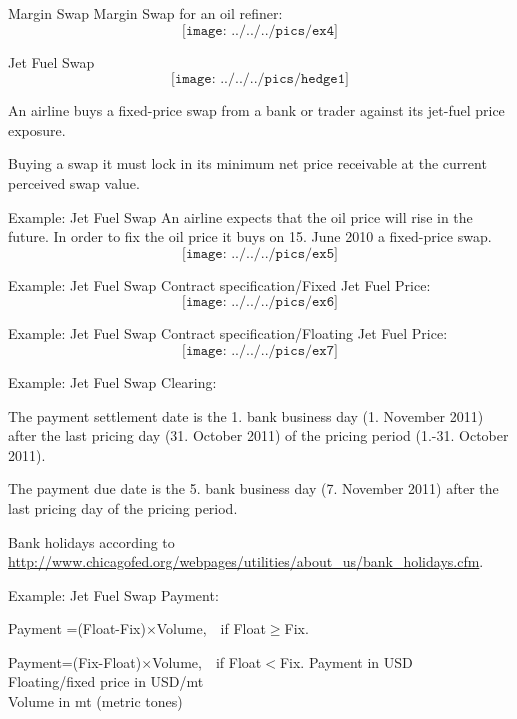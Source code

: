 {Margin Swap}
Margin Swap for an oil refiner:
$$\texttt{[image: ../../../pics/ex4]}$$


{Jet Fuel Swap}
\vspace{-0.4cm}
$$\texttt{[image: ../../../pics/hedge1]}$$
\vspace{-0.7cm}
  \item<1-> An airline buys a fixed-price swap from a bank or trader against its jet-fuel price exposure.
  \item<2-> Buying a swap it must lock in its minimum net price receivable at the current perceived swap value.

{Example: Jet Fuel Swap}
An airline expects that the oil price will rise in the future. In order to fix the oil price it buys on 15. June 2010 a \textcolor[rgb]{1.00,0.00,0.00}{fixed-price swap}. $$\texttt{[image: ../../../pics/ex5]}$$

{Example: Jet Fuel Swap}
Contract specification/Fixed Jet Fuel Price:\\
\vspace{0.2cm}
$$\texttt{[image: ../../../pics/ex6]}$$

{Example: Jet Fuel Swap}
Contract specification/Floating Jet Fuel Price:\\
\vspace{0.2cm}
$$\texttt{[image: ../../../pics/ex7]}$$

{Example: Jet Fuel Swap}
Clearing:
  \item<1-> The payment settlement date is the 1. bank business day (1. November 2011) after the last pricing day (31. October 2011) of the pricing period (1.-31. October 2011).
  \item<2-> The payment due date is the 5. bank business day (7. November 2011) after the last pricing day of the pricing period.
  \item<3-> Bank holidays according to \url{http://www.chicagofed.org/webpages/utilities/about_us/bank_holidays.cfm}.

{Example: Jet Fuel Swap}
Payment:
  \item Payment =(Float-Fix)$\times$Volume,$\quad$if Float$\geq$Fix.
  \item Payment=(Fix-Float)$\times$Volume,$\quad$if Float$<$Fix.
\vspace{0.3cm}
Payment in USD\\
Floating/fixed price in USD/mt\\
Volume in mt (metric tones)

